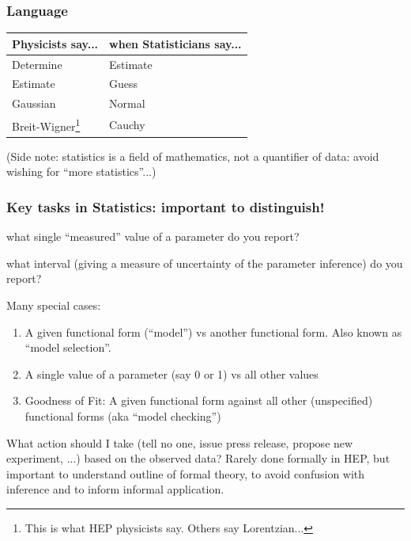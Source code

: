 \documentclass[9pt]{beamer}
\newif\ifmynote
\newcommand\mynote[1]{%
\ifmynote \textbf{#1} \else \fi
}
\begin{document}
\begin{frame}
 \frametitle{Language}
 
 \mynote{Tableau d'abord}
 
 \begin{center}
 \begin{tabular}{ll}
  Physicists say... & when Statisticians say... \\
  \hline
  Determine & Estimate \\
  Estimate & Guess \\
  Gaussian & Normal \\
  Breit-Wigner\footnote{This is what HEP physicists say. Others say Lorentzian...} & Cauchy \\
 \end{tabular}
 \end{center}
 
 (Side note: statistics is a field of mathematics, not a quantifier of data: avoid wishing for ``more statistics''...)
 

\end{frame}

\begin{frame}
 \frametitle{Key tasks in Statistics: important to distinguish!}
 
 \begin{description}
  \item<1->[Point estimation:] what single ``measured'' value of a parameter do you report?
  \item<2->[Interval estimation:] what interval (giving a measure of uncertainty of the parameter inference) do you report?
  \item<3->[Hypothesis testing:] Many special cases:
  \begin{enumerate}
   \item A given functional form (“model”) vs another functional
form. Also known as “model selection”.
  \item A single value of a parameter (say 0 or 1) vs all other values
  \item Goodness of Fit: A given functional form against all other
(unspecified) functional forms (aka “model checking”)
  \end{enumerate}
  \item<4>[Decision making:] What action should I take (tell no one, issue
press release, propose new experiment, ...) based on the
observed data? Rarely done formally in HEP, but important to
understand outline of formal theory, to avoid confusion with
inference and to inform informal application.
  \end{description}

\end{frame}
\end{document}
